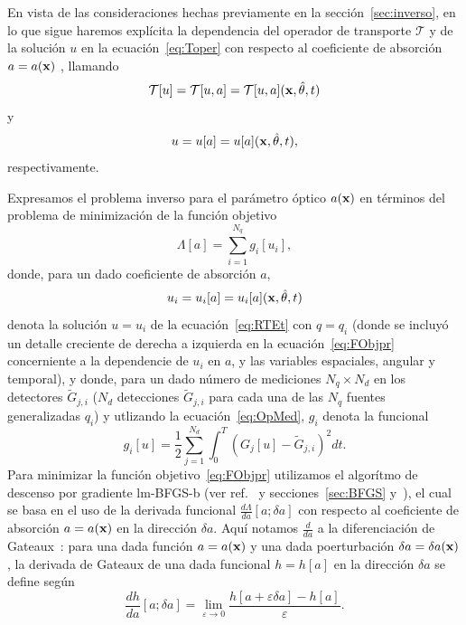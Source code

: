 En vista de las consideraciones hechas previamente en la sección~\ref{sec:inverso}, 
en lo que sigue haremos explícita la dependencia del operador de transporte 
$\mathcal{T}$ y de la solución $u$ en la ecuación~\eqref{eq:Toper} 
con respecto al coeficiente de absorción $a=a(\mathbf{x})$ , llamando 
\begin{equation}\label{eq:Toper_a}
  \mathcal{T}[u] = \mathcal{T}[u,a]= \mathcal{T}[u,a](\mathbf{x},\hat{\theta},t)
\end{equation}
y
\begin{equation}\label{u_of_a}
  u=u[a]=u[a](\mathbf{x},\hat{\theta},t),
\end{equation}
respectivamente.

Expresamos el problema inverso para el parámetro óptico  $a(\mathbf{x})$ 
en términos del problema de minimización de la función objetivo
\begin{equation}
  \Lambda[a]=\sum_{i=1}^{N_q} g_i[u_i],
\label{eq:FObjpr}
\end{equation}
donde, para un dado coeficiente de absorción $a$,
\begin{equation}\label{ui_of_a}
  u_i = u_i[a] = u_i[a](\mathbf{x},\hat{\theta},t)
\end{equation}
denota la solución $u=u_i$ de la ecuación~\eqref{eq:RTEt} con $q=q_i$ 
(donde se incluyó un detalle creciente de derecha a izquierda en la ecuación~\eqref{eq:FObjpr}
concerniente a la dependencie de $u_i$ en $a$, y las variables espaciales, angular y temporal), 
y donde, para un dado número de mediciones $N_q \times N_d$ en los detectores $\tilde{G}_{j,i}$ 
($N_d$ detecciones $\tilde{G}_{j,i}$ para cada una de las $N_q$ fuentes generalizadas $q_i$) 
y utlizando la ecuación~\eqref{eq:OpMed}, $g_i$ denota la funcional 
\begin{equation}
  g_i[u] = \frac{1}{2} \sum_{j=1}^{N_d} \int_0^T (G_j[u]-\tilde
  {G}_{j,i})^2 dt.
\label{eq:FObj}
\end{equation}
Para minimizar la función objetivo~\eqref{eq:FObjpr} utilizamos el algorítmo 
de descenso por gradiente 
lm-BFGS-b (ver ref.~\cite{Byrd1995} y secciones~\ref{sec:BFGS} y~\label{sec:lmBFGS}), 
el cual se basa en el uso de la derivada funcional $\frac{d\Lambda}{da} [a;\delta a]$ 
con respecto al coeficiente de absorción $a = a(\mathbf{x})$ en la dirección $\delta a$. 
Aquí notamos $\frac{d}{da}$ a la diferenciación de Gateaux~\cite{Hille1974}: 
para una dada función $a= a(\mathbf{x})$ y una dada poerturbación $\delta a= \delta a(\mathbf{x})$, 
la derivada de Gateaux de una dada funcional $h = h[a]$ en la dirección $\delta a$ 
se define según
\begin{equation}\label{gateaux}
  \frac{dh}{da}[a; \delta a ] = \lim_{\varepsilon \to 0} \frac{h[a +\varepsilon \delta a]
    - h[a]}{\varepsilon}.
\end{equation}
